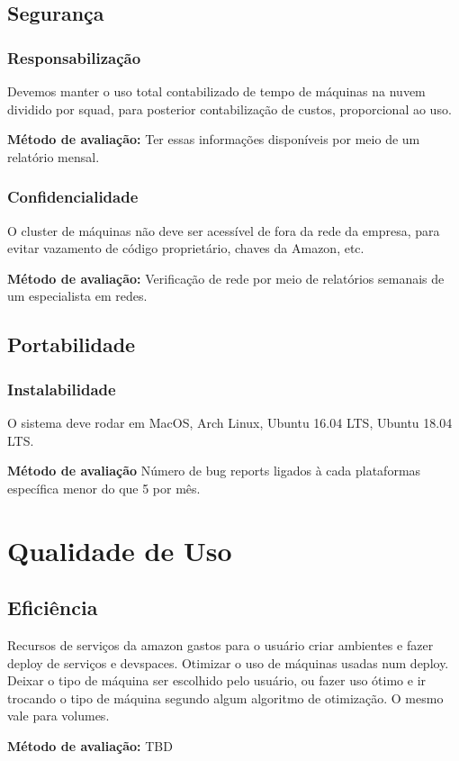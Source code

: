 \documentclass[twosideprint]{politex}
\begin{document}
     \subsection{Segurança}
            \subsubsection{Responsabilização}
            Devemos manter o uso total contabilizado de tempo de máquinas na nuvem dividido por squad, para posterior contabilização de custos, proporcional ao uso.\par
            \textbf{Método de avaliação:}
            Ter essas informações disponíveis por meio de um relatório mensal.
            \subsubsection{Confidencialidade}
            O cluster de máquinas não deve ser acessível de fora da rede da empresa, para evitar vazamento de código proprietário, chaves da Amazon, etc.\par
            \textbf{Método de avaliação:}
            Verificação de rede por meio de relatórios semanais de um especialista em redes.
     \subsection{Portabilidade}
            \subsubsection{Instalabilidade}
            O sistema deve rodar em MacOS, Arch Linux, Ubuntu 16.04 LTS, Ubuntu 18.04 LTS.\par
            \textbf{Método de avaliação}
            Número de bug reports ligados à cada plataformas específica menor do que 5 por mês.
   
   \section {Qualidade de Uso}
     \subsection{Eficiência}
          Recursos de serviços da amazon gastos para o usuário criar ambientes e fazer deploy de serviços e devspaces.
               Otimizar o uso de máquinas usadas num deploy. Deixar o tipo de máquina ser escolhido pelo usuário, ou fazer uso ótimo e ir trocando o tipo de máquina segundo algum algoritmo de otimização. O mesmo vale para volumes.\par
              \textbf{Método de avaliação:}
              TBD
\end{document}
